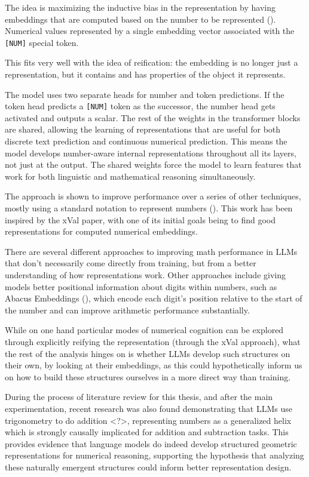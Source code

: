 \documentclass[
  a4paper, twoside, 10pt, titlepage]{book}
\begin{document}
The idea is maximizing the inductive bias in the representation by
having embeddings that are computed based on the number to be
represented (). Numerical
values represented by a single embedding vector associated with the
\texttt{{[}NUM{]}} special token.

This fits very well with the idea of reification: the embedding is no
longer just a representation, but it contains and has properties of the
object it represents.

The model uses two separate heads for number and token predictions. If
the token head predicts a \texttt{{[}NUM{]}} token as the successor, the
number head gets activated and outputs a scalar. The rest of the weights
in the transformer blocks are shared, allowing the learning of
representations that are useful for both discrete text prediction and
continuous numerical prediction. This means the model develops
number-aware internal representations throughout all its layers, not
just at the output. The shared weights force the model to learn features
that work for both linguistic and mathematical reasoning simultaneously.

The approach is shown to improve performance over a series of other
techniques, mostly using a standard notation to represent numbers
(). This work has been
inspired by the xVal paper, with one of its initial goals being to find
good representations for computed numerical embeddings.

There are several different approaches to improving math performance in
LLMs that don't necessarily come directly from training, but from a
better understanding of how representations work. Other approaches
include giving models better positional information about digits within
numbers, such as Abacus Embeddings (), which encode each digit's position relative to the start
of the number and can improve arithmetic performance substantially.

While on one hand particular modes of numerical cognition can be
explored through explicitly reifying the representation (through the
xVal approach), what the rest of the analysis hinges on is whether LLMs
develop such structures on their own, by looking at their embeddings, as
this could hypothetically inform us on how to build these structures
ourselves in a more direct way than training.

During the process of literature review for this thesis, and after the
main experimentation, recent research was also found demonstrating that
LLMs use trigonometry to do addition \textless?\textgreater,
representing numbers as a generalized helix which is strongly causally
implicated for addition and subtraction tasks. This provides evidence
that language models do indeed develop structured geometric
representations for numerical reasoning, supporting the hypothesis that
analyzing these naturally emergent structures could inform better
representation design.
\end{document}
